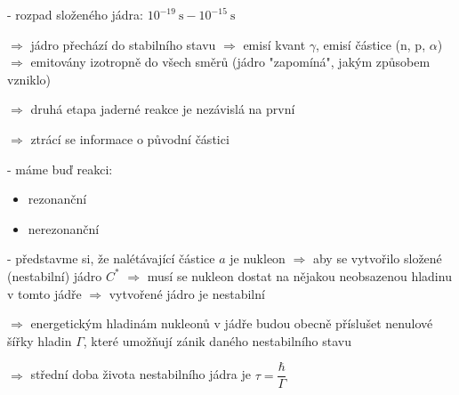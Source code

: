 \documentclass[../../main.tex]{subfiles}
\begin{document}
- rozpad složeného jádra: $10^{-19} ~\mathrm{s} - 10^{-15} ~\mathrm{s}$

$\Rightarrow$ jádro přechází do stabilního stavu $\Rightarrow$ emisí kvant $\gamma$, emisí částice (n, p, $\alpha$) $\Rightarrow$ emitovány izotropně do všech směrů (jádro "zapomíná", jakým způsobem vzniklo)

$\Rightarrow$ druhá etapa jaderné reakce je nezávislá  na první

$\Rightarrow$ ztrácí se informace o původní částici

- máme buď reakci:
\begin{itemize}
	\item rezonanční
	\item nerezonanční
\end{itemize}

- představme si, že nalétávající částice $a$ je nukleon $\Rightarrow$ aby se vytvořilo složené (nestabilní) jádro $C^{*}$ $\Rightarrow$ musí se nukleon dostat na nějakou neobsazenou hladinu v tomto jádře $\Rightarrow$ vytvořené jádro je nestabilní

$\Rightarrow$ energetickým hladinám nukleonů v jádře budou obecně příslušet nenulové šířky hladin $\Gamma$, které umožňují zánik daného nestabilního stavu 

$\Rightarrow$ střední doba života nestabilního jádra je $\tau = \dfrac{\hbar}{\Gamma}$
\end{document}
